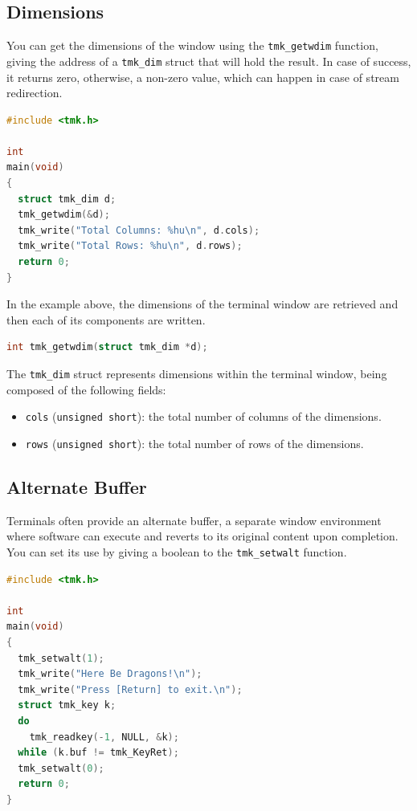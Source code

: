 \documentclass{report}
\begin{document}
\subsection{Dimensions}
You can get the dimensions of the window using the \texttt{tmk\_getwdim} function, giving the address of a \texttt{tmk\_dim} struct that will hold the result. In case of success, it returns zero, otherwise, a non-zero value, which can happen in case of stream redirection.
\begin{lstlisting}[language=c,caption=an example that gets the terminal window dimensions.]
#include <tmk.h>

int
main(void)
{
  struct tmk_dim d;
  tmk_getwdim(&d);
  tmk_write("Total Columns: %hu\n", d.cols);
  tmk_write("Total Rows: %hu\n", d.rows);
  return 0;
}
\end{lstlisting}

In the example above, the dimensions of the terminal window are retrieved and then each of its components are written.
\begin{lstlisting}[language=c,caption=the declaration of the \texttt{tmk\_getwdim} function.]
int tmk_getwdim(struct tmk_dim *d);
\end{lstlisting}

The \texttt{tmk\_dim} struct represents dimensions within the terminal window, being composed of the following fields:
\begin{itemize}
  \item \texttt{cols} (\texttt{unsigned short}): the total number of columns of the dimensions.
  \item \texttt{rows} (\texttt{unsigned short}): the total number of rows of the dimensions.
\end{itemize}
\subsection{Alternate Buffer}
Terminals often provide an alternate buffer, a separate window environment where software can execute and reverts to its original content upon completion. You can set its use by giving a boolean to the \texttt{tmk\_setwalt} function.
\begin{lstlisting}[language=c,caption=an example that shows an usage for the alternate buffer.]
#include <tmk.h>

int
main(void)
{
  tmk_setwalt(1);
  tmk_write("Here Be Dragons!\n");
  tmk_write("Press [Return] to exit.\n");
  struct tmk_key k;
  do
    tmk_readkey(-1, NULL, &k);
  while (k.buf != tmk_KeyRet);
  tmk_setwalt(0);
  return 0;
}
\end{lstlisting}
\end{document}
